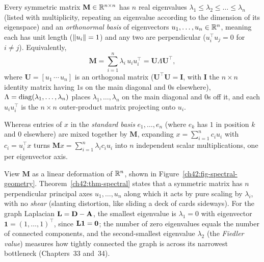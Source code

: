 \begin{theorem}
\label{ch42:thm-spectral}
Every symmetric matrix $\mathbf{M} \in \mathbb{R}^{n\times n}$ has $n$ real eigenvalues
$\lambda_1 \le \lambda_2 \le \dots \le \lambda_n$ (listed with multiplicity, repeating an eigenvalue according to the dimension of its eigenspace) and an \emph{orthonormal basis} of eigenvectors $u_1, \dots, u_n \in \mathbb{R}^n$, meaning each has unit length ($\lVert u_i\rVert = 1$) and any two are perpendicular ($u_i^\top u_j = 0$ for $i \ne j$). Equivalently,
\[
  \mathbf{M} = \sum_{i=1}^n \lambda_i\, u_i u_i^\top = \mathbf{U}\Lambda\mathbf{U}^\top,
\]
where $\mathbf{U} = [u_1\,\cdots\,u_n]$ is an orthogonal matrix ($\mathbf{U}^\top\mathbf{U} = \mathbf{I}$, with $\mathbf{I}$ the $n\times n$ identity matrix having $1$s on the main diagonal and $0$s elsewhere), $\Lambda = \operatorname{diag}(\lambda_1,\dots,\lambda_n)$ places $\lambda_1,\dots,\lambda_n$ on the main diagonal and $0$s off it, and each $u_i u_i^\top$ is the $n\times n$ outer-product matrix projecting onto $u_i$.
\end{theorem}

Whereas entries of $x$ in the \emph{standard basis} $e_1,\dots,e_n$ (where $e_k$ has $1$ in position $k$ and $0$ elsewhere) are mixed together by $\mathbf{M}$, expanding $x = \sum_{i=1}^n c_i u_i$ with $c_i = u_i^\top x$ turns $\mathbf{M}x = \sum_{i=1}^n \lambda_i c_i u_i$ into $n$ independent scalar multiplications, one per eigenvector axis.

\begin{intuitionbox}
View $\mathbf{M}$ as a linear deformation of $\mathbb{R}^n$, shown in Figure~\ref{ch42:fig-spectral-geometry}. Theorem~\ref{ch42:thm-spectral} states that a symmetric matrix has $n$ perpendicular principal axes $u_1,\dots,u_n$ along which it acts by pure scaling by $\lambda_i$, with no \emph{shear} (slanting distortion, like sliding a deck of cards sideways). For the graph Laplacian $\mathbf{L} = \mathbf{D} - \mathbf{A}$, the smallest eigenvalue is $\lambda_1 = 0$ with eigenvector $\mathbf{1} = (1,\dots,1)^\top$, since $\mathbf{L}\mathbf{1} = \mathbf{0}$; the number of zero eigenvalues equals the number of connected components, and the second-smallest eigenvalue $\lambda_2$ (the \emph{Fiedler value}) measures how tightly connected the graph is across its narrowest bottleneck (Chapters~33 and~34).
\end{intuitionbox}

